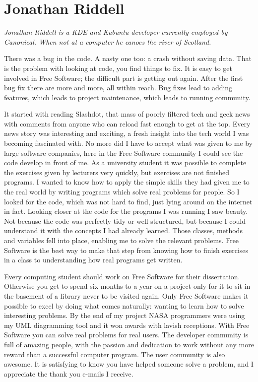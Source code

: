 \chapter{Jonathan Riddell}

\textit{Jonathan Riddell is a KDE and Kubuntu developer currently employed by Canonical. When not at a computer he canoes the river of Scotland.}

There was a bug in the code. A nasty one too: a crash without saving data. That is the problem with looking at code, you find things to fix. It is easy to get involved in Free Software; the difficult part is getting out again. After the first bug fix there are more and more, all within reach. Bug fixes lead to adding features, which leads to project maintenance, which leads to running community. 

It started with reading Slashdot, that mass of poorly filtered tech and geek news with comments from anyone who can reload fast enough to get at the top. Every news story was interesting and exciting, a fresh insight into the tech world I was becoming fascinated with. No more did I have to accept what was given to me by large software companies, here in the Free Software community I could see the code develop in front of me.
As a university student it was possible to complete the exercises given by lecturers very quickly, but exercises are not finished programs. I wanted to know how to apply the simple skills they had given me to the real world by writing programs which solve real problems for people. So I looked for the code, which was not hard to find, just lying around on the internet in fact. 
Looking closer at the code for the programs I was running I saw beauty. Not because the code was perfectly tidy or well structured, but because I could understand it with the concepts I had already learned. Those classes, methods and variables fell into place, enabling me to solve the relevant problems. Free Software is the best way to make that step from knowing how to finish exercises in a class to understanding how real programs get written.

Every computing student should work on Free Software for their dissertation. Otherwise you get to spend six months to a year on a project only for it to sit in the basement of a library never to be visited again. Only Free Software makes it possible to excel by doing what comes naturally: wanting to learn how to solve interesting problems. By the end of my project NASA programmers were using my UML diagramming tool and it won awards with lavish receptions. With Free Software you can solve real problems for real users.
The developer community is full of amazing people, with the passion and dedication to work without any more reward than a successful computer program. The user community is also awesome. It is satisfying to know you have helped someone solve a problem, and I appreciate the thank you e-mails I receive.

